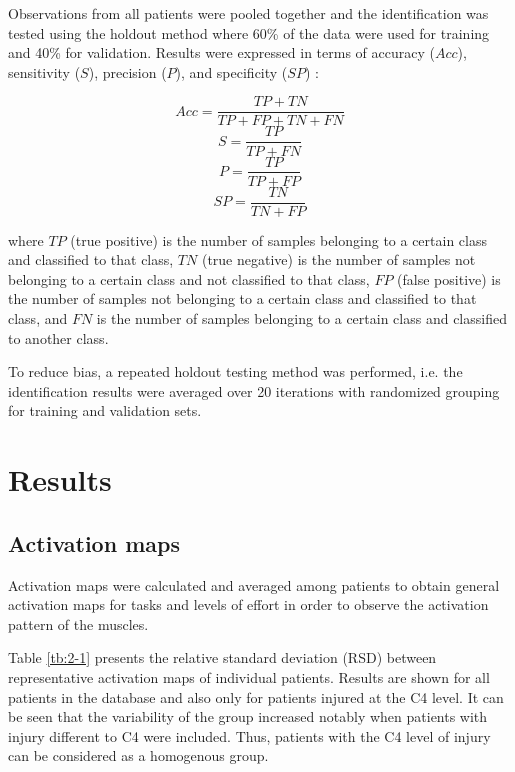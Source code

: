 Observations from all patients were pooled together and the identification was tested using the holdout method where 60\% of the data were used for training and 40\% for validation. Results were expressed in terms of accuracy ($Acc$), sensitivity ($S$), precision ($P$), and specificity ($SP$) \citep{Farina2001}:

\begin{equation} \label{eq:2-4}
Acc = \frac{TP + TN}{TP + FP + TN + FN}
\end{equation}
\begin{equation} \label{eq:2-5}
S = \frac{TP}{TP + FN}
\end{equation}
\begin{equation} \label{eq:2-6}
P = \frac{TP}{TP + FP}
\end{equation}
\begin{equation} \label{eq:2-7}
SP = \frac{TN}{TN + FP}
\end{equation}

where $TP$ (true positive) is the number of samples belonging to a certain class and classified to that class, $TN$ (true negative) is the number of samples not belonging to a certain class and not classified to that class, $FP$ (false positive) is the number of samples not belonging to a certain class and classified to that class, and $FN$ is the number of samples belonging to a certain class and classified to another class. 

To reduce bias, a repeated holdout testing method was performed, i.e. the identification results were averaged over 20 iterations with randomized grouping for training and validation sets.



\section{Results}
\subsection{Activation maps}
Activation maps were calculated and averaged among patients to obtain general activation maps for tasks and levels of effort in order to observe the activation pattern of the muscles.

Table \ref{tb:2-1} presents the relative standard deviation (RSD) between representative activation maps of individual patients. Results are shown for all patients in the database and also only for patients injured at the C4 level. It can be seen that the variability of the group increased notably when patients with injury different to C4 were included. Thus, patients with the C4 level of injury can be considered as a homogenous group.

